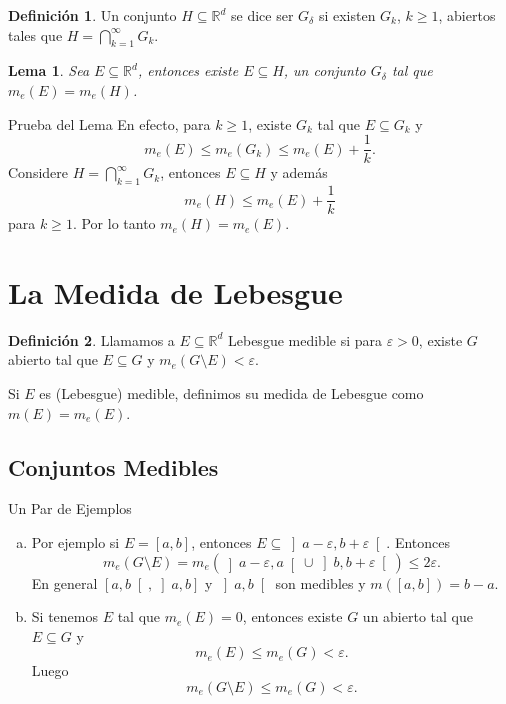 \documentclass[utf8]{beamer}
\theoremstyle{plain}
\newtheorem{Lem}{Lema}                 %
\theoremstyle{definition}
\newtheorem{Def}{Definición}           %
\theoremstyle{remark}
\numberwithin{equation}{section}
\newcommand{\dl}{\delta}                %
\newcommand{\eps}{\varepsilon}          %
\newcommand{\bR}{\mathbb{R}}    %
\newcommand{\bonj}[1]{\left\lbrack#1\right\rbrack}
\newcommand{\obonj}[1]{\left\rbrack#1\right\lbrack}
\newcommand{\rbonj}[1]{\left\rbrack#1\right\rbrack}
\newcommand{\lbonj}[1]{\left\lbrack#1\right\lbrack}
\renewcommand{\geq}{\geqslant}          %
\renewcommand{\leq}{\leqslant}          %
\newcommand{\less}{\setminus}           %
\newcommand{\suck}{_{k=1}^\infty} %
\renewcommand{\.}{\Cdot}                %
\begin{document}
\begin{frame}
\begin{Def}\label{def:Gdelta}
  Un conjunto $H\subseteq\bR^d$ se dice ser \alert{$G_\dl$} si existen $G_k$, $k\geq 1$, abiertos tales que $H=\bigcap\suck G_k$.
\end{Def}  
\begin{Lem}\label{lem:GdelApprox}
  Sea $E\subseteq\bR^d$, entonces existe $E\subseteq H$, un conjunto $G_\dl$ tal que $m_e(E)=m_e(H)$.
\end{Lem}

\end{frame}
\begin{frame}{Prueba del Lema}
  En efecto, para $k\geq 1$, existe $G_k$ tal que $E\subseteq G_k$ y 
$$m_e(E)\leq m_e(G_k)\leq m_e(E)+\frac1k.$$
Considere $H=\bigcap\suck G_k$, entonces $E\subseteq H$ y además 
$$m_e(H)\leq m_e(E)+\frac1k$$
para $k\geq 1$. Por lo tanto $m_e(H)=m_e(E)$.
\end{frame}

\section{La Medida de Lebesgue}

\begin{frame}
  \begin{Def}\label{def:LebesgueMedible}
    Llamamos a $E\subseteq\bR^d$ \alert{Lebesgue medible} si para $\eps>0$, existe $G$ abierto tal que $E\subseteq G$ y $m_e(G\less E)<\eps$.\par 
    Si $E$ es (Lebesgue) medible, definimos su medida de Lebesgue como $m(E)=m_e(E)$.
  \end{Def}
  
\end{frame}
\subsection{Conjuntos Medibles}
\begin{frame}{Un Par de Ejemplos}
  \begin{enumerate}[a)]
  \item Por ejemplo si $E=[a,b]$, entonces $E\subseteq\obonj{a-\eps,b+\eps}$. Entonces
    $$m_e(G\less E)=m_e(\obonj{a-\eps,a}\cup\obonj{b,b+\eps})\leq 2\eps.$$
    En general $\lbonj{a,b},\rbonj{a,b}$ y $\obonj{a,b}$ son medibles y $m(\bonj{a,b})=b-a$.
   \item Si tenemos $E$ tal que $m_e(E)=0$, entonces existe $G$ un abierto tal que $E\subseteq G$ y 
    $$m_e(E)\leq m_e(G)<\eps.$$
    Luego 
    $$m_e(G\less E)\leq m_e(G)<\eps.$$
\end{enumerate}
\end{frame}
\end{document}
